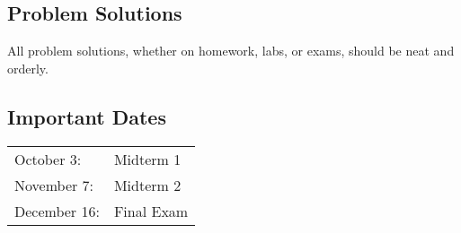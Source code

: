 \subsection{Problem Solutions}\label{problem-solutions}

All problem solutions, whether on homework, labs, or exams, should be
neat and orderly.

\subsection{Important Dates}\label{important-dates}

\begin{longtable}[]{@{}ll@{}}
\toprule
\begin{minipage}[t]{0.34\columnwidth}\raggedright\strut
October 3:\strut
\end{minipage} & \begin{minipage}[t]{0.35\columnwidth}\raggedright\strut
Midterm 1\strut
\end{minipage}\tabularnewline
\begin{minipage}[t]{0.34\columnwidth}\raggedright\strut
November 7:\strut
\end{minipage} & \begin{minipage}[t]{0.35\columnwidth}\raggedright\strut
Midterm 2\strut
\end{minipage}\tabularnewline
\begin{minipage}[t]{0.34\columnwidth}\raggedright\strut
December 16:\strut
\end{minipage} & \begin{minipage}[t]{0.35\columnwidth}\raggedright\strut
Final Exam\strut
\end{minipage}\tabularnewline
\bottomrule
\end{longtable}
